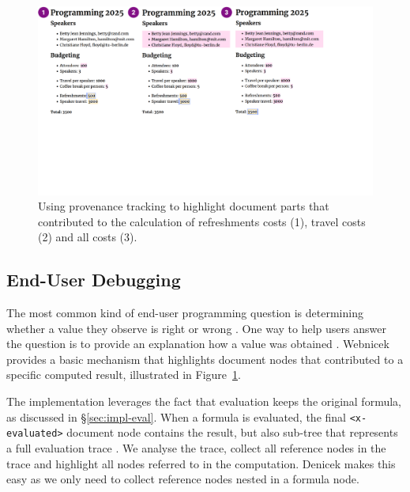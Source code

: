 \documentclass[sigconf,anonymous,screen]{acmart}
\begin{document}

\begin{figure}[t]
\includegraphics[width=1\columnwidth,clip,trim=0cm 8cm 5cm 0cm]{fig/provenance.pdf}
\vspace{-1em}
\caption{Using provenance tracking to highlight document parts that contributed to the
calculation of refreshments costs (1), travel costs (2) and all costs (3).}
\label{fig:provenance}
\vspace{-0.5em}
\end{figure}


\subsection{End-User Debugging}
\label{sec:impl-provenance}

The most common kind of end-user programming question is determining whether a value they observe
is right or wrong \cite{kissinger-2006-debugging}. One way to help users answer the question is
to provide an explanation how a value was obtained \cite{ko-2009-whyline}. Webnicek provides a basic
mechanism that highlights document nodes that contributed to a specific computed result,
illustrated in Figure~\ref{fig:provenance}.

The implementation leverages the fact that evaluation keeps the original formula, as discussed
in \S\ref{sec:impl-eval}. When a formula is evaluated, the final {\small\Verb_<x-evaluated>_}
document node contains the result, but also sub-tree that represents a full evaluation trace
\cite{perera-2012-functional}. We analyse the trace, collect all reference nodes in the trace and
highlight all nodes referred to in the computation. Denicek makes this easy as we
only need to collect reference nodes nested in a formula node.
\end{document}
